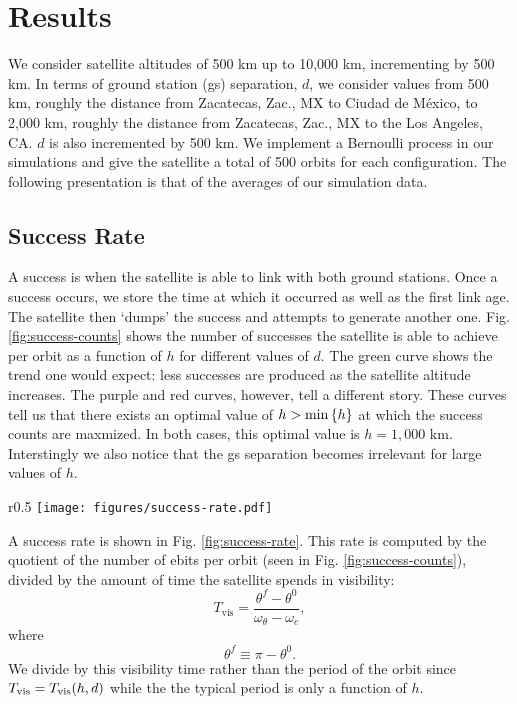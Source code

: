 \vspace*{-1.5cm}
\chapter{Results}

We consider satellite altitudes of 500 km up to 10,000 km, incrementing by 500 km. In terms of ground station (gs) separation, \(d\), we consider values from 500 km, roughly the distance from Zacatecas, Zac., MX to Ciudad de M\'{e}xico, to 2,000 km, roughly the distance from Zacatecas, Zac., MX to the Los Angeles, CA. \(d\) is also incremented by 500 km. We implement a Bernoulli process in our simulations and give the satellite a total of 500 orbits for each configuration. The following presentation is that of the averages of our simulation data.

\section{Success Rate}

A success is when the satellite is able to link with both ground stations. Once a success occurs, we store the time at which it occurred as well as the first link age. The satellite then `dumps' the success and attempts to generate another one. Fig. \ref{fig:success-counts} shows the number of successes the satellite is able to achieve per orbit as a function of \(h\) for different values of \(d\). The \textcolor{mygreen}{green} curve shows the trend one would expect: less successes are produced as the satellite altitude increases. The \textcolor{mypurple}{purple} and \textcolor{myred}{red} curves, however, tell a different story. These curves tell us that there exists an optimal value of \(h > \min\qty{h}\) at which the success counts are maxmized. In both cases, this optimal value is \(h = 1,000\) km. Interstingly we also notice that the gs separation becomes irrelevant for large values of \(h\).

\begin{wrapfigure}[19]{r}{0.5\textwidth}
    \centering
    \vspace{-.1\baselineskip}
    \texttt{[image: figures/success-rate.pdf]}
    \caption{}
    \label{fig:success-rate}
\end{wrapfigure}

A success rate is shown in Fig. \ref{fig:success-rate}. This rate is computed by the quotient of the number of ebits per orbit (seen in Fig. \ref{fig:success-counts}), divided by the amount of time the satellite spends in visibility:
\begin{equation}
    T_{\text{vis}} = \frac{\theta^f - \theta^0}{\omega_\theta - \omega_e},
\end{equation}
where
\begin{equation*}
    \theta^f \equiv \pi - \theta^0.
\end{equation*}
We divide by this visibility time rather than the period of the orbit since \(T_{\text{vis}} = T_{\text{vis}} \qty(h, d)\) while the the typical period is only a function of \(h\).

